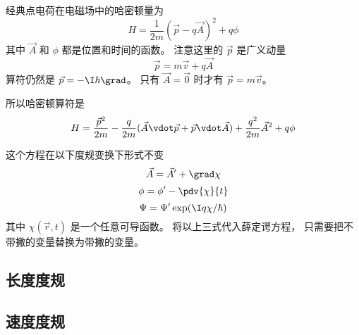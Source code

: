 

经典点电荷在电磁场中的哈密顿量为
\begin{equation}
H = \frac{1}{2m}(\vec p - q\vec A)^2 + q\phi
\end{equation}
其中 $\vec A$ 和 $\phi$ 都是位置和时间的函数。 注意这里的 $\vec p$ 是广义动量
\begin{equation}
\vec p = m\vec v + q\vec A
\end{equation}
算符仍然是 ${\vec p} = -\I\hbar\grad$。 只有 $\vec A = \vec 0$ 时才有 $\vec p = m\vec v$。

所以哈密顿算符是
\begin{equation}
H = \frac{\vec p^2}{2m} - \frac{q}{2m}(\vec A\vdot \vec p + \vec p \vdot \vec A) + \frac{q^2}{2m} \vec A^2 + q\phi
\end{equation}

这个方程在以下度规变换下形式不变
\begin{equation}
\vec A = \vec A' + \grad \chi
\end{equation}
\begin{equation}
\phi = \phi' - \pdv{\chi}{t}
\end{equation}
\begin{equation}
\Psi = \Psi' \exp(\I q\chi/\hbar)
\end{equation}
其中 $\chi(\vec r, t)$ 是一个任意可导函数。 将以上三式代入薛定谔方程， 只需要把不带撇的变量替换为带撇的变量。

\subsection{长度度规}

\subsection{速度度规}
